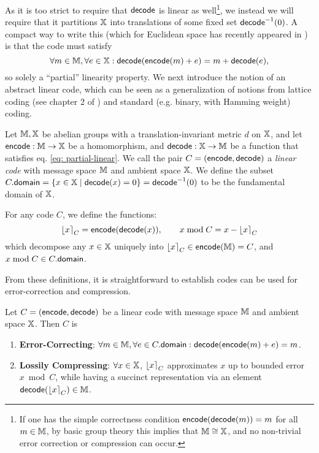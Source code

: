 As it is too strict to require that $\mathsf{decode}$ is linear as well\footnote{If one has the simple correctness condition $\mathsf{encode}(\mathsf{decode}(m)) = m$ for all $m\in\mathbb{M}$, by basic group theory this implies that $\mathbb{M}\cong\mathbb{X}$, and no non-trivial error correction or compression can occur.}, we instead we will require that it partitions $\mathbb{X}$ into translations of some fixed set $\mathsf{decode}^{-1}(0)$.
A compact way to write this (which for Euclidean space has recently appeared in \cite{prest-exact-sampling})
is that the code must satisfy
\begin{equation}\label{eq: partial-linear}
\forall m\in \mathbb{M}, \forall e\in\mathbb{X} : \mathsf{decode}(\mathsf{encode}(m) + e) = m + \mathsf{decode}(e),
\end{equation}
so solely a ``partial'' linearity property.
We next introduce the notion of an abstract linear code, which can be seen as a generalization of notions from lattice coding (see chapter 2 of \cite{zamir_nazer_kochman_bistritz_2014}) and standard (e.g. binary, with Hamming weight) coding.

\begin{definition}
	Let $\mathbb{M}, \mathbb{X}$ be abelian groups with a translation-invariant metric $d$ on $\mathbb{X}$, and let $\mathsf{encode} : \mathbb{M}\to\mathbb{X}$ be a homomorphism, and $\mathsf{decode} : \mathbb{X}\to\mathbb{M}$ be a function that satisfies eq. \eqref{eq: partial-linear}.
	We call the pair $C = (\mathsf{encode}, \mathsf{decode})$ a \emph{linear code} with message space $\mathbb{M}$ and ambient space $\mathbb{X}$.
	We define the subset $C.\mathsf{domain} = \{x\in\mathbb{X} \mid \mathsf{decode}(x) = 0\} = \mathsf{decode}^{-1}(0)$ to be the fundamental domain of $\mathbb{X}$.
	
	For any code $C$, we define the functions:
	\begin{equation*}
	\left\lfloor x\right\rceil_C = \mathsf{encode}(\mathsf{decode}(x)),\qquad x\bmod C = x - \left\lfloor x\right\rceil_C
	\end{equation*}
	which decompose any $x\in\mathbb{X}$ uniquely into $\left\lfloor x\right\rceil_C\in \mathsf{encode}(\mathbb{M}) = C$, and $x\bmod C\in C.\mathsf{domain}$.
\end{definition}

From these definitions, it is straightforward to establish codes can be used for error-correction and compression.
\begin{theorem}
	Let $C = (\mathsf{encode}, \mathsf{decode})$ be a linear code with message space $\mathbb{M}$ and ambient space $\mathbb{X}$.
	Then $C$ is
	\begin{enumerate}
		\item \textbf{Error-Correcting}: $\forall m\in\mathbb{M}, \forall e\in C.\mathsf{domain} : \mathsf{decode}(\mathsf{encode}(m) + e) = m $.
		\item \textbf{Lossily Compressing}: $\forall x\in\mathbb{X}$, $\left\lfloor x\right\rceil_C$ approximates $x$ up to bounded error $x\bmod C$, while having a succinct representation via an element $\mathsf{decode}(\left\lfloor x\right\rceil_C)\in\mathbb{M}$.
	\end{enumerate}	
\end{theorem}


